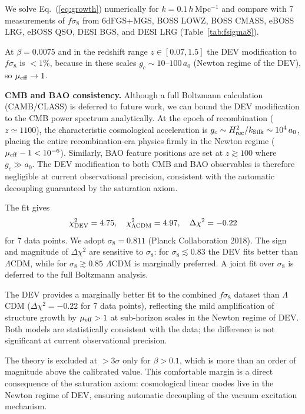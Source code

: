 \documentclass[aps,prd,twocolumn,showpacs,superscriptaddress]{revtex4-2}
\newcommand{\aO}{a_0}
\newcommand{\mueff}{\mu_{\rm eff}}
\newcommand{\LCDM}{$\Lambda$CDM}
\begin{document}
We solve Eq.~(\ref{eq:growth}) numerically for $k = 0.1\,h\,$Mpc$^{-1}$
and compare with 7 measurements of $f\sigma_8$ from
6dFGS+MGS, BOSS LOWZ, BOSS CMASS, eBOSS LRG,
eBOSS QSO, DESI BGS, and DESI LRG
(Table~\ref{tab:fsigma8}).

At $\beta = 0.0075$ and in the redshift range $z\in[0.07, 1.5]$
the DEV modification to $f\sigma_8$ is $< 1\%$,
because in these scales $g_c \sim 10$--$100\,\aO$
(Newton regime of the DEV), so $\mueff \to 1$.

\textbf{CMB and BAO consistency.}
Although a full Boltzmann calculation (CAMB/CLASS) is deferred
to future work, we can bound the DEV modification to the
CMB power spectrum analytically.
At the epoch of recombination ($z \simeq 1100$), the
characteristic cosmological acceleration is
$g_c \sim H_{\rm rec}^2 / k_{\rm Silk} \sim 10^4\,\aO$,
placing the entire recombination-era physics firmly in
the Newton regime ($\mueff - 1 < 10^{-6}$).
Similarly, BAO feature positions are set at $z \gtrsim 100$
where $g_c \gg \aO$.
The DEV modification to both CMB and BAO observables
is therefore negligible at current observational precision,
consistent with the automatic decoupling guaranteed by
the saturation axiom.

The fit gives
\begin{equation}
  \chi^2_{\rm DEV} = 4.75, \quad
  \chi^2_{\Lambda{\rm CDM}} = 4.97, \quad
  \Delta\chi^2 = -0.22
\end{equation}
for 7 data points.
We adopt $\sigma_8 = 0.811$ (Planck Collaboration 2018).
The sign and magnitude of $\Delta\chi^2$ are sensitive to
$\sigma_8$: for $\sigma_8 \lesssim 0.83$ the DEV fits better
than \LCDM{}, while for $\sigma_8 \gtrsim 0.85$ \LCDM{} is
marginally preferred. A joint fit over $\sigma_8$ is deferred
to the full Boltzmann analysis.

The DEV provides a marginally better fit to the combined
$f\sigma_8$ dataset than \LCDM{} ($\Delta\chi^2 = -0.22$ for
7 data points), reflecting the mild amplification of structure
growth by $\mu_{\rm eff} > 1$ at sub-horizon scales in the
Newton regime of DEV. Both models are statistically consistent
with the data; the difference is not significant at current
observational precision.

The theory is excluded at $>3\sigma$ only for $\beta > 0.1$,
which is more than an order of magnitude above the calibrated value.
This comfortable margin is a direct consequence of the saturation
axiom: cosmological linear modes live in the Newton regime of DEV,
ensuring automatic decoupling of the vacuum excitation mechanism.
\end{document}

